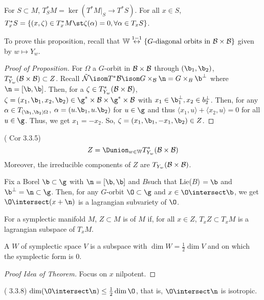 \begin{defn}
  For \(S \subset M\), \(T^*_S M = \ker(T^*M|_S \to T^* S)\). For all \(x
  \in S\), \(T_x^* S = \{(x,\zeta) \in T_x^*M \st \zeta(\alpha) = 0,
  \forall \alpha \in T_x S\}\).
\end{defn}
To prove this proposition, recall that \(\mathbb{W} \overset{1-1}{\leftrightarrow} \{G\text{-diagonal orbits in }\mathcal{B}
\times \mathcal{B}\}\) given by \(w \mapsto Y_w\). 
\begin{proof}[Proof of Proposition]
  For \(\Omega\) a \(G\)-orbit in \(\mathcal{B} \times \mathcal{B}\) through
  \((\b_1,\b_2)\), \(T_{Y_w}^*(\mathcal{B} \times \mathcal{B}) \subset Z\).  Recall
  \(\tilde{\cN} \isom T^* \cB 
\isom G \times_\cB \n = G \times_B \b^\perp\) where \(\n =
[\b,\b]\). Then, for a \(\zeta \in T^*_{Y_w}(\mathcal{B} \times \mathcal{B})\),
\(\zeta = (x_1, \b_1, x_2, \b_2) \in \g^* \times \cB \times \g^*
\times \cB\) with \(x_1 \in \b_1^\perp, x_2 \in b_2^\perp\). Then, for
any \(\alpha \in T_{(\b_1,\b_2) \Omega}\), \(\alpha = (u.\b_1,
u.\b_2)\) for \(u \in \g\) and thus \(\langle x_1, u \rangle + \langle
x_2, u\rangle = 0\) for all \(u \in \g\). Thus, we get \(x_1 =
-x_2\). So, \(\zeta = (x_1, \b_1, -x_1, \b_2) \in Z\). 
\end{proof}
\begin{cor}
  (\cite{cg} Cor 3.3.5) \[
    Z = \Dunion_{w \in \W} T_{Y_w}^*(\cB \times \cB)
  \]
  Moreover, the irreducible components of \(Z\) are \(T_{Y_w}(\mathcal{B}
  \times \mathcal{B})\).
\end{cor}
\begin{thm}
  Fix a Borel \(\b \subset \g\) with \(\n = [\b,\b]\) and \(B\)such
  that Lie(\(B\)) \(= \b\) and \(\b^\perp = \n \subset \g\). Then, for
  any \(G\)-orbit \(\O \subset \g\) and \(x \in \O \intersect \b\), we get
  \(\O \intersect (x+\n)\) is a lagrangian subvariety of \(\O\).
\end{thm}
\begin{defn}
  For a symplectic manifold \(M\), \(Z \subset M\) is  of \(M\) if, for all \(x \in Z\), \(T_x Z \subset T_x
  M\) is a lagrangian subspace of \(T_x M\).
\end{defn}
\begin{defn}
  A  \(W\) of symplectic space \(V\) is a
  subspace with \(\dim 
  W = \frac{1}{2} \dim V\) and on which the symplectic form is \(0\).
\end{defn}
\begin{proof}[Proof Idea of Theorem]
  Focus on \(x\) nilpotent.
\end{proof}
\begin{lem}
  (\cite{cg} 3.3.8) \(\dim(\O \intersect \n) \leq \frac{1}{2} \dim
  \O\), that is, \(\O \intersect \n\) is isotropic.
\end{lem}
